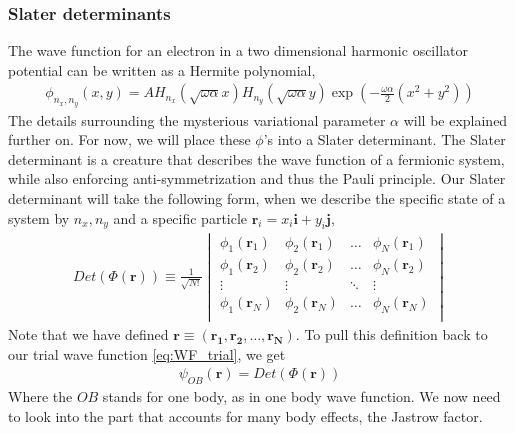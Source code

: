 \documentclass[11pt]{article}
\begin{document}
\subsubsection{Slater determinants}
The wave function for an electron in a two dimensional harmonic oscillator potential can be written as a Hermite polynomial,
\begin{align}
	\phi_{n_x,n_y}(x,y) = AH_{n_x} (\sqrt{\omega\alpha}x) H_{n_y} (\sqrt{\omega\alpha} y) \exp{\left(-\frac{\omega\alpha}{2}\left( x^2 + y^2 \right)\right)}
\end{align}
The details surrounding the mysterious variational parameter $\alpha$ will be explained further on. For now, we will place these $\phi$'s into a Slater determinant. The Slater determinant is a creature that describes the wave function of a fermionic system, while also enforcing anti-symmetrization and thus the Pauli principle. Our Slater determinant will take the following form, when we describe the specific state of a system by $n_x, n_y$ and a specific particle $\mathbf{r}_i = x_i\mathbf{i} + y_i\mathbf{j}$,
\begin{align}
	Det(\Phi(\mathbf{r})) \equiv \frac{1}{\sqrt{N!}}
	\begin{vmatrix}
		\phi_1(\mathbf{r}_1)	& \phi_2(\mathbf{r}_1) 	& \hdots 	& \phi_N(\mathbf{r}_1) 	\\
		\phi_1(\mathbf{r}_2) 	& \phi_2(\mathbf{r}_2) 	& \hdots 	& \phi_N(\mathbf{r}_2) 	\\
		\vdots 					& \vdots				& \ddots 	& \vdots 				\\
		\phi_1(\mathbf{r}_N) 	& \phi_2(\mathbf{r}_N) 	& \hdots 	& \phi_N(\mathbf{r}_N) 	\\
	\end{vmatrix}
	\label{eq:slater_determinant}
\end{align}
Note that we have defined $\mathbf{r} \equiv (\mathbf{r_1},\mathbf{r_2},\dots,\mathbf{r_N})$. To pull this definition back to our trial wave function \eqref{eq:WF_trial}, we get
\begin{align}
	\psi_{OB}(\mathbf{r}) = Det(\Phi(\mathbf{r}))
	\label{eq:WF_onebody}
\end{align}
Where the $OB$ stands for one body, as in one body wave function. We now need to look into the part that accounts for many body effects, the Jastrow factor.
\end{document}
